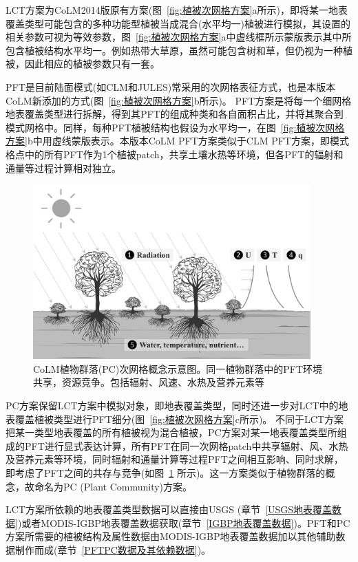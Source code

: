 LCT方案为CoLM2014版原有方案(图~\ref{fig:植被次网格方案}a所示)，即将某一地表覆盖类型可能包含的多种功能型植被当成混合(水平均一)植被进行模拟，其设置的相关参数可视为等效参数，图~\ref{fig:植被次网格方案}a中虚线框所示蒙版表示其中所包含植被结构水平均一。例如热带大草原，虽然可能包含树和草，但仍视为一种植被，因此相应的植被参数只有一套。

PFT是目前陆面模式(如CLM和JULES)常采用的次网格表征方式，也是本版本CoLM新添加的方式(图~\ref{fig:植被次网格方案}b所示)。
PFT方案是将每一个细网格地表覆盖类型进行拆解，得到其PFT的组成种类和各自面积占比，并将其聚合到模式网格中。同样，每种PFT植被结构也假设为水平均一，在图~\ref{fig:植被次网格方案}b中用虚线蒙版表示。本版本CoLM PFT方案类似于CLM PFT方案，即模式格点中的所有PFT作为1个植被patch，共享土壤水热等环境，但各PFT的辐射和通量等过程计算相对独立。

{
\begin{figure}[htbp]
\centering
\includegraphics[width=0.95\textwidth]{Figures/模式构架/植物群落示意图.png}
\caption[CoLM植物群落(PC)次网格概念示意图]{CoLM植物群落(PC)次网格概念示意图。同一植物群落中的PFT环境共享，资源竞争。包括辐射、风速、水热及营养元素等}
\label{fig:植物群落示意图}
\end{figure}
}

PC方案保留LCT方案中模拟对象，即地表覆盖类型，同时还进一步对LCT中的地表覆盖植被类型进行PFT细分(图~\ref{fig:植被次网格方案}c所示)。
不同于LCT方案把某一类型地表覆盖的所有植被视为混合植被，PC方案对某一地表覆盖类型所组成的PFT进行显式表达计算，所有PFT在同一次网格patch中共享辐射、风、水热及营养元素等环境，同时辐射和通量计算等过程PFT之间相互影响、同时求解，即考虑了PFT之间的共存与竞争(如图~\ref{fig:植物群落示意图} 所示)。这一方案类似于植物群落的概念，故命名为PC (Plant Community)方案。

LCT方案所依赖的地表覆盖类型数据可以直接由USGS (章节~\ref{USGS地表覆盖数据})或者MODIS-IGBP地表覆盖数据获取(章节~\ref{IGBP地表覆盖数据})。PFT和PC方案所需要的植被结构及属性数据由MODIS-IGBP地表覆盖数据加以其他辅助数据制作而成(章节~\ref{PFTPC数据及其依赖数据})。

